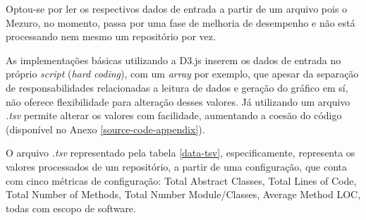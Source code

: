 Optou-se por ler os respectivos dados de entrada a partir de um arquivo pois o Mezuro, no momento, passa por uma fase de melhoria de desempenho e não está processando nem mesmo um repositório por vez.

As implementações básicas utilizando a D3.js inserem os dados de entrada no próprio \textit{script} (\textit{hard coding}), com um \textit{array} por exemplo, que apesar da separação de responsabilidades relacionadas a leitura de dados e geração do gráfico em sí, não oferece flexibilidade para alteração desses valores. Já utilizando um arquivo \textit{.tsv} permite alterar os valores com facilidade, aumentando a coesão do código (disponível no Anexo \ref{source-code-appendix}). 

O arquivo \textit{.tsv} representado pela tabela \ref{data-tsv}, especificamente, representa os valores processados de um repositório, a partir de uma configuração, que conta com cinco métricas de configuração: Total Abstract Classes, Total Lines of Code, Total Number of Methods, Total Number Module/Classes, Average Method LOC, todas com escopo de software.

 





